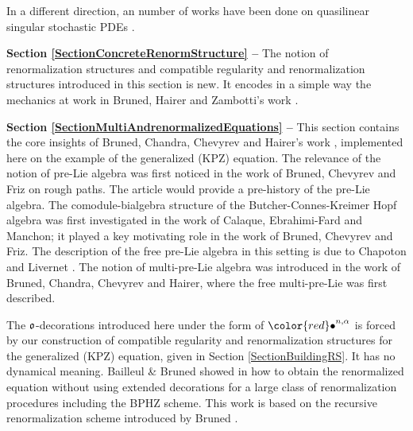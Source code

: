 \documentclass[10pt, reqno]{amsart}
\numberwithin{subsection}{section}
\numberwithin{subsubsection}{subsection}
\numberwithin{equation}{section} %
\theoremstyle{mystyle}
\theoremstyle{mystyle2}
\theoremstyle{mystyle3}
\newcommand{\ssk}{\smallskip}
\begin{document}
In a different direction, an number of works have been done on quasilinear singular stochastic PDEs \cite{BDH, BailleulMouzard, FG, GerencserHairer, LOT, LOTT, OttoWeber, OSSW, OSSW2}.

\medskip

\textbf{\textsf{Section \ref{SectionConcreteRenormStructure} -- }} The notion of renormalization structures and compatible regularity and renormalization structures introduced in this section is new. It encodes in a simple way the mechanics at work in Bruned, Hairer and Zambotti's work \cite{BHZ}.   

\medskip

\textbf{\textsf{Section \ref{SectionMultiAndrenormalizedEquations} -- }} This section contains the core insights of Bruned, Chandra, Chevyrev and Hairer's work \cite{BCCH18}, implemented here on the example of the generalized (KPZ) equation. The relevance of the notion of pre-Lie algebra was 
first noticed in the work \cite{BrunedChevyrevFriz} of Bruned, Chevyrev and Friz on rough paths. The article \cite{Cayley} would provide a pre-history of the pre-Lie algebra. The comodule-bialgebra structure of the Butcher-Connes-Kreimer Hopf algebra was first investigated in the work \cite{CalaqueEbrahimiFardManchon} of Calaque, Ebrahimi-Fard and Manchon; it played a key motivating role in the work of Bruned, Chevyrev and Friz. The description of the free pre-Lie algebra in this setting is due to Chapoton and Livernet \cite{ChapotonLivernet}. The notion of multi-pre-Lie algebra was introduced in the work \cite{BCCH18} of Bruned, Chandra, Chevyrev and 
Hairer, where the free multi-pre-Lie was first described.

The $\frak{o}$-decorations introduced here under the form of ${\color{red} \bullet}^{n,\alpha}$ is forced by our construction of compatible regularity and renormalization structures for the generalized (KPZ) equation, given in Section \ref{SectionBuildingRS}. It has no dynamical meaning. Bailleul \& Bruned showed in \cite{BailleulBruned} how to obtain the renormalized equation without using extended decorations for a large class of renormalization procedures including the BPHZ scheme. This work is based on the recursive renormalization scheme introduced by Bruned \cite{BrunedRecursive}.

\ssk
\end{document}
